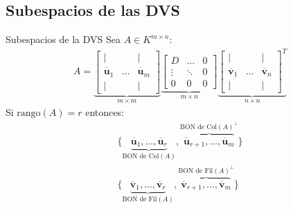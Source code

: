 \documentclass[a4paper, twoside]{article}
\numberwithin{equation}{section}
\numberwithin{figure}{section}
\numberwithin{table}{section}
\newcommand{\vect}[1]{\overline{\textbf{#1}}}
\newcommand{\fil}[1]{\text{Fil}(#1)}
\newcommand{\col}[1]{\text{Col}(#1)}
\newcommand{\rg}[1]{\text{rango}\left(#1\right)}
\begin{document}
\subsection{Subespacios de las DVS}
\begin{corolario*}{Subespacios de la DVS}
	Sea $A \in K^{m \times n}$:
	\begin{align}
		A=\underbrace{\begin{bmatrix}{|}&{ }&{|}\\{\vect{u}_1}&{\ldots}&{\vect{u}_m}\\{|}&{ }&{|}\end{bmatrix}}_{m \times m}\underbrace{\begin{bmatrix}{D}&{\ldots}&{0}\\{\vdots}&{\ddots}&{0}\\{0}&{0}&{0}\end{bmatrix}}_{m \times n}\underbrace{\begin{bmatrix}{|}&{ }&{|}\\{\vect{v}_1}&{\ldots}&{\vect{v}_n}\\{|}&{ }&{|}\end{bmatrix}^T}_{n \times n}
	\end{align}
	Si $\rg{A}=r$ entonces:
	\begin{align}
		\{\underbrace{\vect{u}_1,\ldots,\vect{u}_r}_{\text{BON de } \col{A}},\overbrace{\vect{u}_{r+1},\ldots,\vect{u}_m}^{\text{BON de } \col{A}^\bot} \} \\
		\{\underbrace{\vect{v}_1,\ldots,\vect{v}_r}_{\text{BON de } \fil{A}},\overbrace{\vect{v}_{r+1},\ldots,\vect{v}_m}^{\text{BON de } \fil{A}^\bot} \}
	\end{align}
\end{corolario*}
\end{document}
